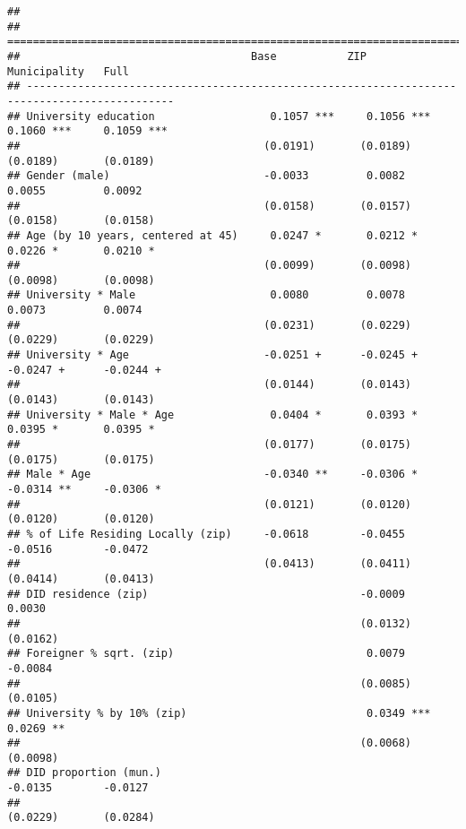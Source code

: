 \documentclass[
]{article}
\begin{document}
\begin{verbatim}
## 
## =============================================================================================
##                                    Base           ZIP            Municipality   Full         
## ---------------------------------------------------------------------------------------------
## University education                  0.1057 ***     0.1056 ***     0.1060 ***     0.1059 ***
##                                      (0.0191)       (0.0189)       (0.0189)       (0.0189)   
## Gender (male)                        -0.0033         0.0082         0.0055         0.0092    
##                                      (0.0158)       (0.0157)       (0.0158)       (0.0158)   
## Age (by 10 years, centered at 45)     0.0247 *       0.0212 *       0.0226 *       0.0210 *  
##                                      (0.0099)       (0.0098)       (0.0098)       (0.0098)   
## University * Male                     0.0080         0.0078         0.0073         0.0074    
##                                      (0.0231)       (0.0229)       (0.0229)       (0.0229)   
## University * Age                     -0.0251 +      -0.0245 +      -0.0247 +      -0.0244 +  
##                                      (0.0144)       (0.0143)       (0.0143)       (0.0143)   
## University * Male * Age               0.0404 *       0.0393 *       0.0395 *       0.0395 *  
##                                      (0.0177)       (0.0175)       (0.0175)       (0.0175)   
## Male * Age                           -0.0340 **     -0.0306 *      -0.0314 **     -0.0306 *  
##                                      (0.0121)       (0.0120)       (0.0120)       (0.0120)   
## % of Life Residing Locally (zip)     -0.0618        -0.0455        -0.0516        -0.0472    
##                                      (0.0413)       (0.0411)       (0.0414)       (0.0413)   
## DID residence (zip)                                 -0.0009                        0.0030    
##                                                     (0.0132)                      (0.0162)   
## Foreigner % sqrt. (zip)                              0.0079                       -0.0084    
##                                                     (0.0085)                      (0.0105)   
## University % by 10% (zip)                            0.0349 ***                    0.0269 ** 
##                                                     (0.0068)                      (0.0098)   
## DID proportion (mun.)                                              -0.0135        -0.0127    
##                                                                    (0.0229)       (0.0284)   

\end{verbatim}
\end{document}
